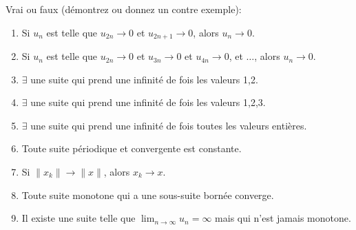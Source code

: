 
\begin{exercice}\label{exo0013}

Vrai ou faux (démontrez ou donnez un contre exemple):
\begin{enumerate}
	\item\label{ItemAExo0013} Si $u_n$ est telle que $u_{2n}\rightarrow  0$ et $u_{2n+1}\rightarrow  0$,  alors $u_n\rightarrow  0$.
	\item Si $u_n$ est telle que $u_{2n}\rightarrow  0$ et $u_{3n}\rightarrow  0$ et $u_{4n}\rightarrow  0$, et $\ldots$,  alors $u_n\rightarrow  0$.
	\item $\exists$ une suite qui prend une infinité de fois les valeurs 1,2.
	\item $\exists$ une suite qui prend une infinité de fois les valeurs 1,2,3.
	\item\label{ItemEnumiE13} $\exists$ une suite qui prend une infinité de fois toutes les valeurs entières.
	\item Toute suite périodique et convergente est constante.
	\item Si  $\| x_k\| \to \| x \|$, alors $x_k\to x$.
	\item Toute suite monotone qui a une sous-suite bornée converge.
	\item Il existe une suite telle que $\lim_{n\rightarrow \infty}u_n = \infty$ mais qui n'est jamais monotone.
\end{enumerate}
\end{exercice}
